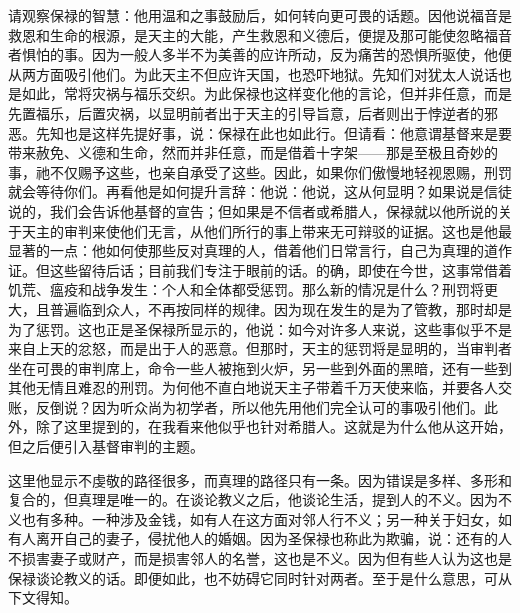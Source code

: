 请观察保禄的智慧：他用温和之事鼓励后，如何转向更可畏的话题。因他说福音是救恩和生命的根源，是天主的大能，产生救恩和义德后，便提及那可能使忽略福音者惧怕的事。因为一般人多半不为美善的应许所动，反为痛苦的恐惧所驱使，他便从两方面吸引他们。为此天主不但应许天国，也恐吓地狱。先知们对犹太人说话也是如此，常将灾祸与福乐交织。为此保禄也这样变化他的言论，但并非任意，而是先置福乐，后置灾祸，以显明前者出于天主的引导旨意，后者则出于悖逆者的邪恶。先知也是这样先提好事，说：保禄在此也如此行。但请看：他意谓基督来是要带来赦免、义德和生命，然而并非任意，而是借着十字架——那是至极且奇妙的事，祂不仅赐予这些，也亲自承受了这些。因此，如果你们傲慢地轻视恩赐，刑罚就会等待你们。再看他是如何提升言辞：他说：他说，这从何显明？如果说是信徒说的，我们会告诉他基督的宣告；但如果是不信者或希腊人，保禄就以他所说的关于天主的审判来使他们无言，从他们所行的事上带来无可辩驳的证据。这也是他最显著的一点：他如何使那些反对真理的人，借着他们日常言行，自己为真理的道作证。但这些留待后话；目前我们专注于眼前的话。的确，即使在今世，这事常借着饥荒、瘟疫和战争发生：个人和全体都受惩罚。那么新的情况是什么？刑罚将更大，且普遍临到众人，不再按同样的规律。因为现在发生的是为了管教，那时却是为了惩罚。这也正是圣保禄所显示的，他说：如今对许多人来说，这些事似乎不是来自上天的忿怒，而是出于人的恶意。但那时，天主的惩罚将是显明的，当审判者坐在可畏的审判席上，命令一些人被拖到火炉，另一些到外面的黑暗，还有一些到其他无情且难忍的刑罚。为何他不直白地说天主子带着千万天使来临，并要各人交账，反倒说？因为听众尚为初学者，所以他先用他们完全认可的事吸引他们。此外，除了这里提到的，在我看来他似乎也针对希腊人。这就是为什么他从这开始，但之后便引入基督审判的主题。\par

这里他显示不虔敬的路径很多，而真理的路径只有一条。因为错误是多样、多形和复合的，但真理是唯一的。在谈论教义之后，他谈论生活，提到人的不义。因为不义也有多种。一种涉及金钱，如有人在这方面对邻人行不义；另一种关于妇女，如有人离开自己的妻子，侵扰他人的婚姻。因为圣保禄也称此为欺骗，说：还有的人不损害妻子或财产，而是损害邻人的名誉，这也是不义。因为但有些人认为这也是保禄谈论教义的话。即便如此，也不妨碍它同时针对两者。至于是什么意思，可从下文得知。\par

